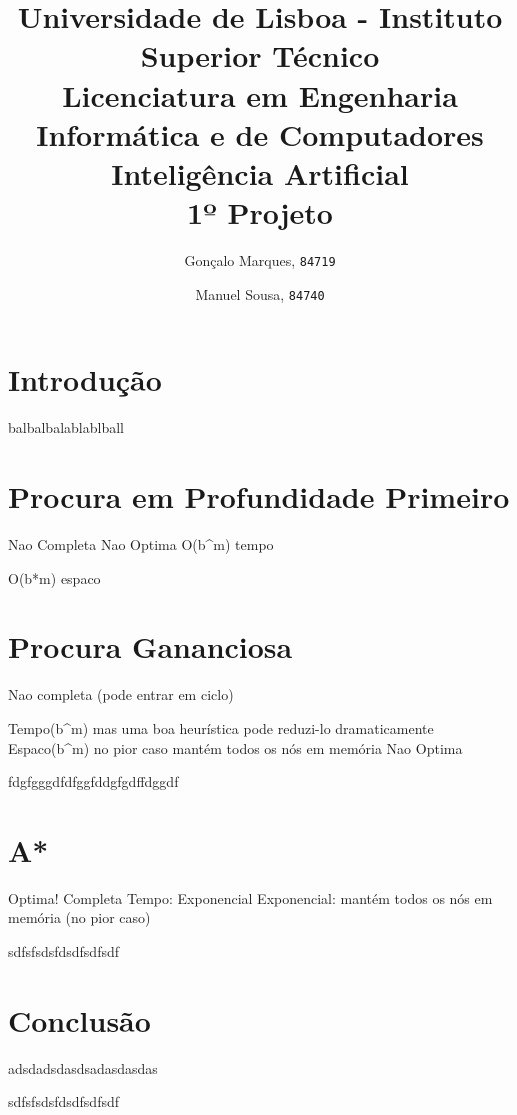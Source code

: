 \documentclass{scrartcl}
\begin{document}

\title{
	\textnormal{
	\LARGE Universidade de Lisboa - Instituto Superior Técnico\\
	\Large Licenciatura em Engenharia Informática e de Computadores\\
	\Large Inteligência Artificial
\\}
	\LARGE1º Projeto
	\vspace{-1ex}
	}
\author{Gonçalo Marques,
	\texttt{84719}
	\and
	Manuel Sousa,
	\texttt{84740}
}
\date{	\vspace{-1ex}
		\vspace{-4ex}
	}
\maketitle

\section*{Introdução}
balbalbalablablball

\section*{Procura em Profundidade Primeiro}
Nao Completa
Nao Optima
O(b^m) tempo \par
O(b*m) espaco

\section*{Procura Gananciosa}
Nao completa (pode entrar em ciclo)\par
Tempo(b^m) mas uma boa heurística pode reduzi-lo dramaticamente
Espaco(b^m) no pior caso mantém todos os nós em memória
Nao Optima\par


fdgfgggdfdfggfddgfgdffdggdf

\section*{A*}
Optima!
Completa
Tempo: Exponencial 
Exponencial: mantém todos os nós em memória (no pior caso)

sdfsfsdsfdsdfsdfsdf

\section*{Conclusão}
adsdadsdasdsadasdasdas

sdfsfsdsfdsdfsdfsdf
\end{document}
